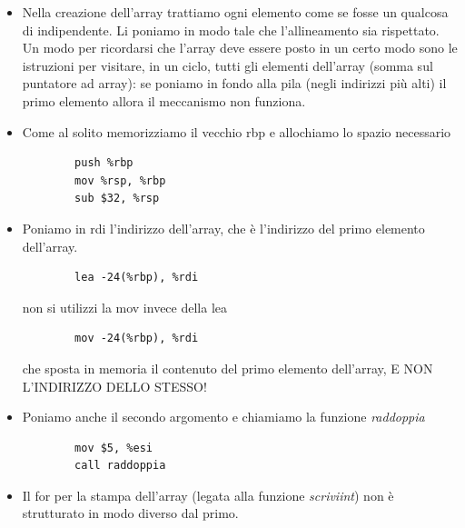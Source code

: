 \begin{itemize}
	\item Nella creazione dell'array trattiamo ogni elemento come se fosse un qualcosa di indipendente. Li poniamo in modo tale che l'allineamento sia rispettato. Un modo per ricordarsi che l'array deve essere posto in un certo modo sono le istruzioni per visitare, in un ciclo, tutti gli elementi dell'array (somma sul puntatore ad array): se poniamo in fondo alla pila (negli indirizzi più alti) il primo elemento allora il meccanismo non funziona.
	\item Come al solito memorizziamo il vecchio rbp e allochiamo lo spazio necessario
	\begin{verbatim}
		push %rbp
		mov %rsp, %rbp
		sub $32, %rsp
	\end{verbatim}
	\item Poniamo in rdi l'indirizzo dell'array, che è l'indirizzo del primo elemento dell'array.
	\begin{verbatim}
		lea -24(%rbp), %rdi
	\end{verbatim}
	non si utilizzi la mov invece della lea
	\begin{verbatim}
		mov -24(%rbp), %rdi
	\end{verbatim}
	che sposta in memoria il contenuto del primo elemento dell'array, E NON L'INDIRIZZO DELLO STESSO!
	\item Poniamo anche il secondo argomento e chiamiamo la funzione \emph{raddoppia}
	\begin{verbatim}
		mov $5, %esi
		call raddoppia
	\end{verbatim}
	\item Il for per la stampa dell'array (legata alla funzione \emph{scriviint}) non è strutturato in modo diverso dal primo.
\end{itemize}
